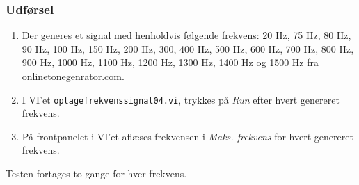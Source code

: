 		\subsubsection{Udførsel}
			\begin{enumerate} 
				\item Der generes et signal med henholdvis følgende frekvens: 20 Hz, 75 Hz, 80 Hz, 90 Hz, 100 Hz, 150 Hz, 200 Hz, 300, 400 Hz, 500 Hz, 600 Hz, 700 Hz, 800 Hz, 900 Hz, 1000 Hz, 1100 Hz, 1200 Hz, 1300 Hz, 1400 Hz og 1500 Hz fra onlinetonegenrator.com.
				\item I VI'et \texttt{optagefrekvenssignal04.vi}, trykkes på \textit{Run} efter hvert genereret frekvens.  
				\item På frontpanelet i VI'et aflæses frekvensen i \textit{Maks. frekvens} for hvert genereret frekvens. 
			\end{enumerate}
			
			Testen fortages to gange for hver frekvens.  
		
